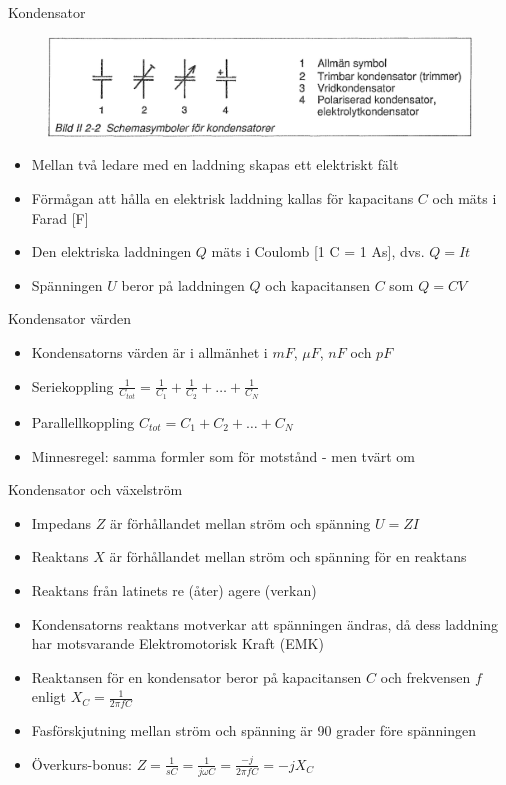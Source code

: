 \documentclass{beamer}
\begin{document}
\begin{frame}{Kondensator}

\begin{figure}[h]
\includegraphics[width=\textwidth]{images/bild_2_2-02}
\end{figure}

\begin{itemize}
  \item Mellan två ledare med en laddning skapas ett elektriskt fält
  \item Förmågan att hålla en elektrisk laddning kallas för kapacitans $C$ och mäts i Farad [F]
  \item Den elektriska laddningen $Q$ mäts i Coulomb [1 C = 1 As], dvs. $Q=It$
  \item Spänningen $U$ beror på laddningen $Q$ och kapacitansen $C$ som $Q=CV$
\end{itemize}
\end{frame}

\begin{frame}{Kondensator värden}
  \begin{itemize}
    \item Kondensatorns värden är i allmänhet i $mF$, $\mu F$, $nF$ och $pF$
    \item Seriekoppling $\frac{1}{C_{tot}} = \frac{1}{C_1} + \frac{1}{C_2} + \ldots + \frac{1}{C_N}$
    \item Parallellkoppling $C_{tot} = C_1 + C_2 + \ldots + C_N$
    \item Minnesregel: samma formler som för motstånd - men tvärt om
  \end{itemize}
\end{frame}

\begin{frame}{Kondensator och växelström}
  \begin{itemize}
  \item Impedans $Z$ är förhållandet mellan ström och spänning $U=ZI$
  \item Reaktans $X$ är förhållandet mellan ström och spänning för en reaktans
  \item Reaktans från latinets re (åter) agere (verkan)
  \item Kondensatorns reaktans motverkar att spänningen ändras, då dess laddning har motsvarande Elektromotorisk Kraft (EMK)
  \item Reaktansen för en kondensator beror på kapacitansen $C$ och frekvensen $f$ enligt $X_C = \frac{1}{2\pi f C}$
  \item Fasförskjutning mellan ström och spänning är 90 grader före spänningen
  \item Överkurs-bonus: $Z = \frac{1}{sC} = \frac{1}{j\omega C} = \frac{-j}{2\pi f C} = -jX_C$
  \end{itemize}
\end{frame}
\end{document}
